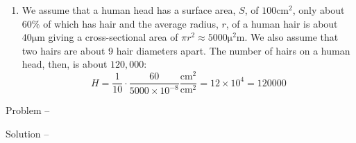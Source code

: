 \documentclass[12pt,a4paper]{book}
\newcommand\Problem[1]{%
   \leavevmode\par
   \stepcounter{problem}
   \noindent
   Problem \textbf{\theproblem} -- #1 \par}
\newcounter{problem}[chapter] %
\newcommand\Solution[1]{%
   \stepcounter{solution}
    \leavevmode\par\noindent
   {\leftskip37pt
    Solution \textbf{\thesolution} -- #1\par}}
\newcounter{solution}[chapter] %
\begin{document}
{\begin{enumerate}
            $r$ be the effective rate of per-generation increase of the population in a geometric progression, 
            
            $C_n$ be the cumulative population up to and including (i.e. the total number of humans who ever lived on earth) the $n\textsuperscript{th}$ generation, 
            
            $A_n$ be the number of immediate ancestors (parents) of the $n\textsuperscript{th}$ generation who are still alive. $A_{n} = P_{n-1}$,
            
            $M$ be the cumulative number of \emph{my} ancetors (I live in the $8001\textsuperscript{st}$ generation),

            $n = 8000$.

            We want to find $M$. Based on the above, for a geometric series,
            $$
                a = 2, P_{8001} = 7\times 10^{9}
            $$ 
            $$
                7\times 10^{9} = 2\cdot r^{8000}
            $$
            \begin{equation}
                \label{eqn: value-of-r}
                \therefore r = 1.0027525 
            \end{equation}
            \begin{align*}
                M 
                &= \frac{C_{8000}}{P_{8001}-A_{8001}} \\
                &= \frac{C_{8000}}{P_{8001}-P_{8000}} \\
                &= \frac{\frac{\cancel{a}\cdot(r^{7999})}{r-1}}{\cancel{a}\cdot (r^{8001}-r^{8000})} \\
                &= \frac{1}{r\cdot(r-1)^{2}} \\
                &\approx 131630 
            \end{align*}
        \item We assume that a human head has a surface area, $S$, of $100\si{\square\cm}$, only about $60\%$ of which has hair and the average radius, $r$, of a human hair is about $40\si{\micro\metre}$ giving a cross-sectional area of $\pi r^2\approx 5000\si{\square\micro\metre}$. We also assume that two hairs are about 9 hair diameters apart. The number of hairs on a human head, then, is about $120,000$:
            $$
                H = \frac{1}{10}\cdot\frac{60}{5000\times 10^{-8}}\frac{\si{\square\cm}}{\si{\square\cm}}
                  = 12\times 10^{4} 
                  = 120000
            $$
    \end{enumerate}
}
\Problem {
}
\Solution {
}
\end{document}
